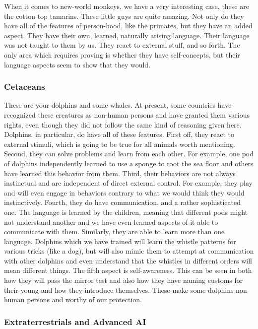 When it comes to new-world monkeys, we have a very interesting case, these are the cotton top tamarins. These little guys are quite amazing. Not only do they have all of the features of person-hood, like the primates, but they have an added aspect. They have their own, learned, naturally arising language. Their language was not taught to them by us. They react to external stuff, and so forth. The only area which requires proving is whether they have self-concepts, but their language aspects seem to show that they would. 
\subsubsection{Cetaceans}

These are your dolphins and some whales. At present, some countries have recognized these creatures as non-human persons and have granted them various rights, even though they did not follow the same kind of reasoning given here. Dolphins, in particular, do have all of these features. First off, they react to external stimuli, which is going to be true for all animals worth mentioning. Second, they can solve problems and learn from each other. For example, one pod of dolphins independently learned to use a sponge to root the sea floor and others have learned this behavior from them. Third, their behaviors are not always instinctual and are independent of direct external control. For example, they play and will even engage in behaviors contrary to what we would think they would instinctively. Fourth, they do have communication, and a rather sophisticated one. The language is learned by the children, meaning that different pods might not understand another and we have even learned aspects of it able to communicate with them. Similarly, they are able to learn more than one language. Dolphins which we have trained will learn the whistle patterns for various tricks (like a dog), but will also mimic them to attempt at communication with other dolphins and even understand that the whistles in different orders will mean different things. The fifth aspect is self-awareness. This can be seen in both how they will pass the mirror test and also how they have naming customs for their young and how they introduce themselves. These make some dolphins non-human persons and worthy of our protection.   
\subsubsection{Extraterrestrials and Advanced AI}

